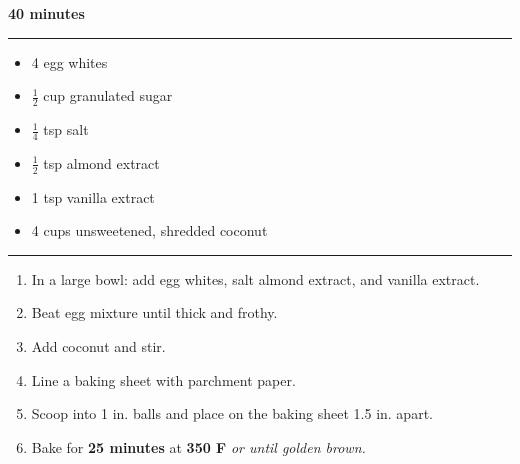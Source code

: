  \hfill {\large \textbf{40 minutes}}

\vspace{15pt} \hrule \vspace{15pt}
\begin{itemize}
	\item 4 egg whites
	\item $\frac{1}{2}$ cup granulated sugar
	\item $\frac{1}{4}$ tsp salt
	\item $\frac{1}{2}$ tsp almond extract
	\item 1 tsp vanilla extract
	\item 4 cups unsweetened, shredded coconut
\end{itemize}

\vspace{15pt} \hrule \vspace{15pt}
\begin{enumerate}
	\item In a large bowl: add egg whites, salt almond extract, and vanilla extract.
	\item Beat egg mixture until thick and frothy.
	\item Add coconut and stir.
	\item Line a baking sheet with parchment paper.
	\item Scoop into 1 in. balls and place on the baking sheet 1.5 in. apart.
	\item Bake for \textbf{25 minutes} at \textbf{350 F} \textit{or until golden brown.}
\end{enumerate}
